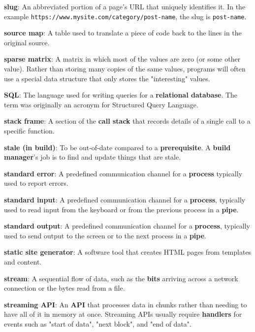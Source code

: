 \documentclass[krantzl]{krantz}
\newcommand{\glosskey}[1]{\textbf{#1}}
\begin{document}
\noindent \textbf{\glosskey{slug}}: 
An abbreviated portion of a page's URL that uniquely identifies it. In the example \texttt{https://www.mysite.com/category/post-name}, the slug is \texttt{post-name}.


\noindent \textbf{\glosskey{source map}}: 
A table used to translate a piece of code back to the lines in the original source.


\noindent \textbf{\glosskey{sparse matrix}}: 
A matrix in which most of the values are zero (or some other value). Rather than storing many copies of the same values, programs will often use a special data structure that only stores the "interesting" values.


\noindent \textbf{\glosskey{SQL}}: 
The language used for writing queries for a \glosskey{relational database}. The term was originally an acronym for Structured Query Language.


\noindent \textbf{\glosskey{stack frame}}: 
A section of the \glosskey{call stack} that records details of a single call to a specific function.


\noindent \textbf{\glosskey{stale (in build)}}: 
To be out-of-date compared to a \glosskey{prerequisite}. A \glosskey{build manager}'s job is to find and update things that are stale.


\noindent \textbf{\glosskey{standard error}}: 
A predefined communication channel for a \glosskey{process} typically used to report errors.


\noindent \textbf{\glosskey{standard input}}: 
A predefined communication channel for a \glosskey{process}, typically used to read input from the keyboard or from the previous process in a \glosskey{pipe}.


\noindent \textbf{\glosskey{standard output}}: 
A predefined communication channel for a \glosskey{process}, typically used to send output to the screen or to the next process in a \glosskey{pipe}.


\noindent \textbf{\glosskey{static site generator}}: 
A software tool that creates HTML pages from templates and content.


\noindent \textbf{\glosskey{stream}}: 
A sequential flow of data, such as the \glosskey{bits} arriving across a network connection or the bytes read from a file.


\noindent \textbf{\glosskey{streaming API}}: 
An \glosskey{API} that processes data in chunks rather than needing to have all of it in memory at once. Streaming APIs usually require \glosskey{handlers} for events such as "start of data", "next block", and "end of data".
\end{document}
